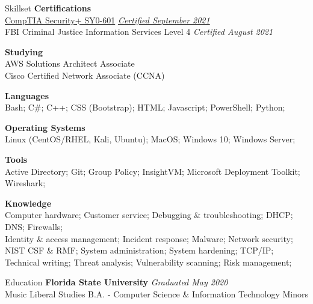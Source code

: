 \documentclass{resume} %
\begin{document}
	\begin{rSection}{Skillset}
		{\bf Certifications} \hfill {\em } \\
		\href{https://www.credly.com/badges/fb3524b2-ef52-4c7b-9854-e00dd92e7046?source=linked_in_profile}{CompTIA Security+ SY0-601} \hfill \href{https://www.credly.com/badges/fb3524b2-ef52-4c7b-9854-e00dd92e7046?source=linked_in_profile}{\em Certified  September 2021}\\
		FBI Criminal Justice Information Services Level 4 \hfill {\em Certified August 2021}
		
		{\bf Studying}\\
		AWS Solutions Architect Associate\\
		Cisco Certified Network Associate (CCNA)
		
		\textbf{Languages}\\
		Bash; C\#; C++; CSS (Bootstrap); HTML; Javascript; PowerShell; Python;
		
		\textbf{Operating Systems}\\
		Linux (CentOS/RHEL, Kali, Ubuntu); MacOS; Windows 10; Windows Server;
		
		
		\textbf{Tools}\\
		Active Directory; Git; Group Policy; InsightVM; Microsoft Deployment Toolkit; Wireshark;
		
		\textbf{Knowledge}\\
		Computer hardware; Customer service; Debugging \& troubleshooting; DHCP; DNS; Firewalls;\\Identity \& access management; Incident response; Malware; Network security; NIST CSF \& RMF; System administration; System hardening; TCP/IP; Technical writing; Threat analysis; Vulnerability scanning; Risk management;
		
		
		
		
	\end{rSection}
	\begin{rSection}{Education}
		{\bf Florida State University} \hfill {\em Graduated May 2020} \\
		Music Liberal Studies B.A. - Computer Science \& Information Technology Minors
	\end{rSection}
\end{document}
